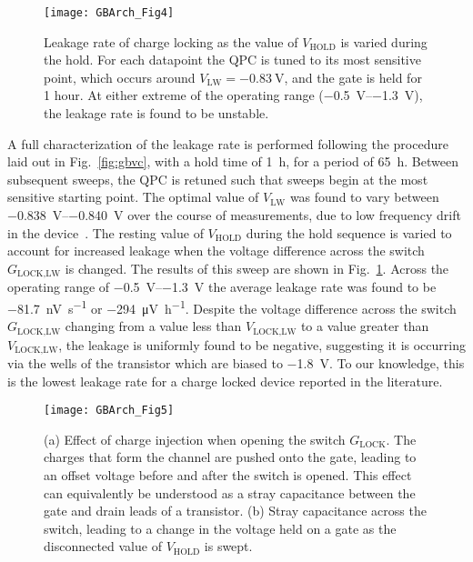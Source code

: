 \begin{figure}
  \texttt{[image: GBArch\_Fig4]}
  \caption[Leakage rate of charge locking]
  {\label{fig:gblr}Leakage rate of charge locking as the value of $V_\textrm{HOLD}$ is varied during the hold. For each datapoint the QPC is tuned to its most sensitive point,
  which occurs around $V_\textrm{LW} = \SI{-0.83}{\volt}$, and the gate is held for 1 hour. At either extreme of the operating range (\SIrange{-0.5}{-1.3}{\volt}), the leakage
  rate is found to be unstable.}
\end{figure}

A full characterization of the leakage rate is performed following the procedure laid out in Fig.~\ref{fig:gbvc}, with a hold time of \SI{1}{\hour}, for a period of \SI{65}{\hour}. Between subsequent sweeps, the QPC is retuned such that sweeps begin at the most sensitive starting point. The optimal value of $V_\textrm{LW}$ was found to vary between \SIrange{-0.838}{-0.840}{\volt} over the course of measurements, due to low frequency drift in the device~\cite{PhysRevApplied.9.034008}. The resting value of $V_\textrm{HOLD}$ during the hold sequence is varied to account for increased leakage when the voltage difference across the switch $G_\textrm{LOCK,LW}$ is changed. The results of this sweep are shown in Fig.~\ref{fig:gblr}. Across the operating range of \SIrange{-0.5}{-1.3}{\volt} the average leakage rate was found to be \SI{-81.7}{\nano\volt\per\second} or \SI{-294}{\micro\volt\per\hour}. Despite the voltage difference across the switch $G_\textrm{LOCK,LW}$ changing from a value less than $V_\textrm{LOCK,LW}$ to a value greater than $V_\textrm{LOCK,LW}$, the leakage is uniformly found to be negative, suggesting it is occurring via the wells of the transistor which are biased to \SI{-1.8}{\volt}. To our knowledge, this is the lowest leakage rate for a charge locked device reported in the literature.

\begin{figure}
  \texttt{[image: GBArch\_Fig5]}
  \caption[Static corrections to hold voltage]
  {\label{fig:gbcorr} (a) Effect of charge injection when opening the switch $G_\textrm{LOCK}$. The charges that form the channel are pushed onto the gate, leading to an offset voltage before and after the switch is opened. This effect can equivalently be understood as a stray capacitance between the gate and drain leads of a transistor. (b) Stray capacitance across the switch, leading to a change in the voltage held on a gate as the disconnected value of $V_\textrm{HOLD}$ is swept.}
\end{figure}

